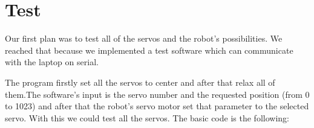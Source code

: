 \chapter{Test}

\label{ch:test}

	Our first plan was to test all of the servos and the robot's possibilities. We reached that because we implemented a test software which can communicate with the laptop on serial. 
	
	
	The program firstly set all the servos to center and after that relax all of them.The software's input is the servo number and the requested position (from 0 to 1023) and after that the robot's servo motor set that parameter to the selected servo. With this we could test all the servos. The basic code is the following:
	
	
	
	
